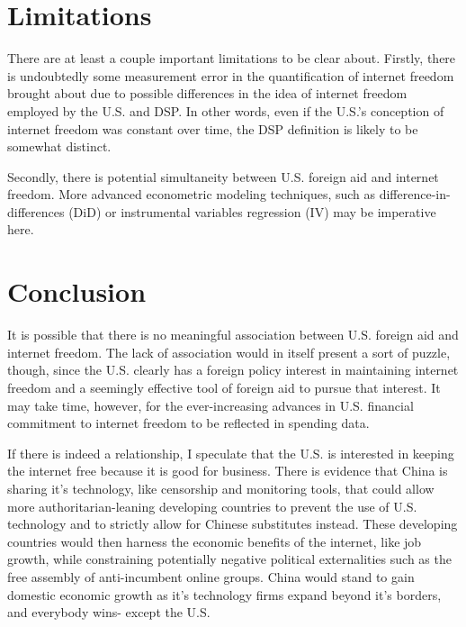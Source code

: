 \documentclass{article}
\begin{document}
\section*{Limitations}
There are at least a couple important limitations to be clear about. Firstly, there is undoubtedly some measurement error in the quantification of internet freedom brought about due to possible differences in the idea of internet freedom employed by the U.S. and DSP. In other words, even if the U.S.'s conception of internet freedom was constant over time, the DSP definition is likely to be somewhat distinct.

Secondly, there is potential simultaneity between U.S. foreign aid and internet freedom. More advanced econometric modeling techniques, such as difference-in-differences (DiD) or instrumental variables regression (IV) may be imperative here. 

\section*{Conclusion}
It is possible that there is no meaningful association between U.S. foreign aid and internet freedom. The lack of association would in itself present a sort of puzzle, though, since the U.S. clearly has a foreign policy interest in maintaining internet freedom and a seemingly effective tool of foreign aid to pursue that interest. It may take time, however, for the ever-increasing advances in U.S. financial commitment to internet freedom to be reflected in spending data.  

If there is indeed a relationship, I speculate that the U.S. is interested in keeping the internet free because it is good for business. There is evidence that China is sharing it's technology, like censorship and monitoring tools, that could allow more authoritarian-leaning developing countries to prevent the use of U.S. technology and to strictly allow for Chinese substitutes instead. These developing countries would then harness the economic benefits of the internet, like job growth, while constraining potentially negative political externalities such as the free assembly of anti-incumbent online groups. China would stand to gain domestic economic growth as it's technology firms expand beyond it's borders, and everybody wins- except the U.S.

\nocite{mechkova2022a}
\nocite{pemstein2022}
\nocite{coppedge2022}
\nocite{coppedge2022a}
\nocite{coppedge2022b}
\nocite{coppedge2022c}
\nocite{coppedge2022d}
\pagebreak
\printbibliography
\end{document}
